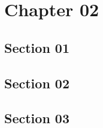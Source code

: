 \chapter{Chapter 02}
\section{Section 01}
\lipsum[1-5]
\section{Section 02}
\lipsum[1-5]
\section{Section 03}
\lipsum[1-5]